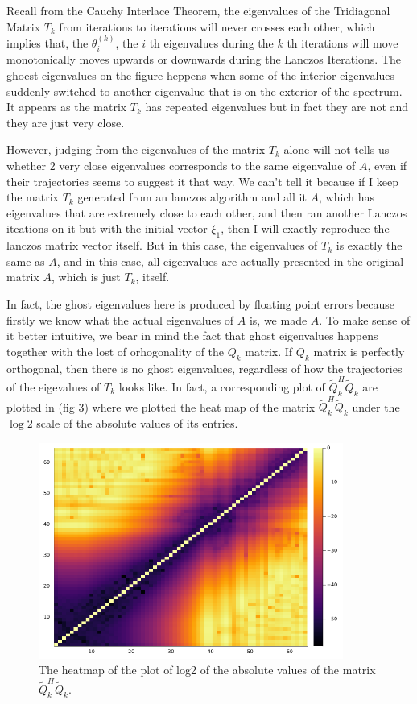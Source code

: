 \documentclass[]{article}
\theoremstyle{definition}
\begin{document}
            Recall from the Cauchy Interlace Theorem, the eigenvalues of the Tridiagonal Matrix $T_k$ from iterations to iterations will never crosses each other, which implies that, the $\theta_i^{(k)}$, the $i$ th eigenvalues during the $k$ th iterations will move monotonically moves upwards or downwards during the Lanczos Iterations. The ghoest eigenvalues on the figure heppens when some of the interior eigenvalues suddenly switched to another eigenvalue that is on the exterior of the spectrum. It appears as the matrix $T_k$ has repeated eigenvalues but in fact they are not and they are just very close. 
            \par
            However, judging from the eigenvalues of the matrix $T_k$ alone will not tells us whether 2 very close eigenvalues corresponds to the same eigenvalue of $A$, even if their trajectories seems to suggest it that way. We can't tell it because if I keep the matrix $T_k$ generated from an lanczos algorithm and all it $A$, which has eigenvalues that are extremely close to each other, and then ran another Lanczos iteations on it but with the initial vector $\xi_1$, then I will exactly reproduce the lanczos matrix vector itself. But in this case, the eigenvalues of $T_k$ is exactly the same as $A$, and in this case, all eigenvalues are actually presented in the original matrix $A$, which is just $T_k$, itself. 
            \par
            In fact, the ghost eigenvalues here is produced by floating point errors because firstly we know what the actual eigenvalues of $A$ is, we made $A$. To make sense of it better intuitive, we bear in mind the fact that ghost eigenvalues happens together with the lost of orhogonality of the $Q_k$ matrix. If $Q_k$ matrix is perfectly orthogonal, then there is no ghost eigenvalues, regardless of how the trajectories of the eigevalues of $T_k$ looks like. In fact, a corresponding plot of $\tilde{Q}_k^H\tilde{Q}_k$ are plotted in \hyperref[fig:3]{(fig 3)} where we plotted the heat map of the matrix $\tilde{Q}^H_k\tilde{Q}_k$ under the $\log2$ scale of the absolute values of its entries. 
            \begin{figure}[H]\label{fig:3}
                \centering
                \includegraphics[width=10cm]{fig3.png}
                \caption{The heatmap of the plot of log2 of the absolute values of the matrix $\tilde{Q}^H_k\tilde{Q}_k$.}
            \end{figure}
\end{document}
